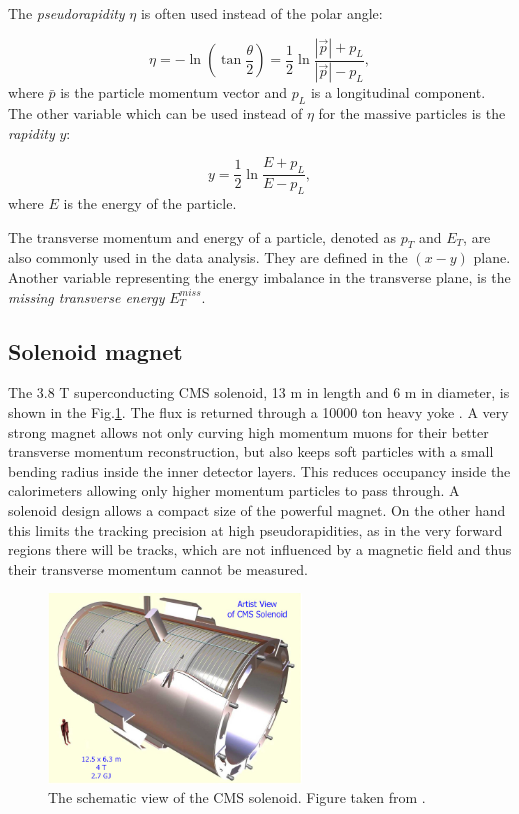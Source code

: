 The \textit{pseudorapidity} $\eta$ is often used instead of the polar angle:

\begin{equation}\label{eq:eta}
  \eta = -\ln(\tan\frac{\theta}{2}) = \frac{1}{2}\ln\frac{|\vec{p}| + p_{L}}{|\vec{p}| - p_{L}},
\end{equation}
where $\bar{p}$ is the particle momentum vector and $p_{L}$ is a longitudinal component.
The other variable which can be used instead of $\eta$ for the massive particles is the \textit{rapidity} $y$:

\begin{equation}\label{eq:y}
  y = \frac{1}{2}\ln\frac{E + p_{L}}{E - p_{L}},
\end{equation} 
where $E$ is the energy of the particle.

The transverse momentum and energy of a particle, denoted as $p_{T}$ and $E_T$, are also commonly used in the data analysis. 
They are defined in the $(x-y)$ plane. Another variable representing the energy imbalance in the transverse plane, is the
\textit{missing transverse energy} $E_{T}^{miss}$.

\subsection{Solenoid magnet}\label{ssec:solenoid}

The 3.8 T superconducting CMS solenoid, 13 m in length and 6 m in diameter, is shown in the Fig.\ref{fig:solenoid}. 
The flux is returned through a 10000 ton heavy yoke \cite{CMSatLHC}. A very strong magnet allows not only curving
high momentum muons for their better transverse  momentum reconstruction, but also keeps soft particles with a small bending radius
inside the inner detector layers. This reduces occupancy inside the calorimeters allowing only higher
momentum particles to pass through. A solenoid design allows a compact size of the powerful magnet.
On the other hand this limits the tracking precision at high pseudorapidities, as in the very forward regions there will be 
tracks, which are not influenced by a magnetic field\cite{Dissertori:2010xe} and thus their transverse momentum cannot be measured.


\begin{figure}[t]
  \centering
  \includegraphics[width=0.6\textwidth]{02_experimental_setup/plots/CERN_CMS_Solenoid_schematic.jpg}
  \caption{The schematic view of the CMS solenoid. Figure taken from \cite{LCCNews}.}
  \label{fig:solenoid}
\end{figure}

